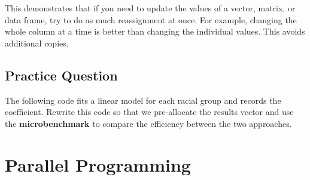 \documentclass[
  letterpaper,
]{latex/krantz}
\makeatletter
\newenvironment{Shaded}{\begin{snugshade}}{\end{snugshade}}
\newcommand{\AttributeTok}[1]{\textcolor[rgb]{0.40,0.45,0.13}{#1}}
\newcommand{\ControlFlowTok}[1]{\textcolor[rgb]{0.00,0.23,0.31}{#1}}
\newcommand{\DecValTok}[1]{\textcolor[rgb]{0.68,0.00,0.00}{#1}}
\newcommand{\FunctionTok}[1]{\textcolor[rgb]{0.28,0.35,0.67}{#1}}
\newcommand{\NormalTok}[1]{\textcolor[rgb]{0.00,0.23,0.31}{#1}}
\newcommand{\OtherTok}[1]{\textcolor[rgb]{0.00,0.23,0.31}{#1}}
\newcommand{\SpecialCharTok}[1]{\textcolor[rgb]{0.37,0.37,0.37}{#1}}
\newenvironment{kframe}{%
\medskip{}
\setlength{\fboxsep}{.8em}
 \def\at@end@of@kframe{}%
 \ifinner\ifhmode%
  \def\at@end@of@kframe{\end{minipage}}%
  \begin{minipage}{\columnwidth}%
 \fi\fi%
 \def\FrameCommand##1{\hskip\@totalleftmargin \hskip-\fboxsep
 \colorbox{shadecolor}{##1}\hskip-\fboxsep
     \hskip-\linewidth \hskip-\@totalleftmargin \hskip\columnwidth}%
 \MakeFramed {\advance\hsize-\width
   \@totalleftmargin\z@ \linewidth\hsize
   \@setminipage}}%
 {\par\unskip\endMakeFramed%
 \at@end@of@kframe}
\renewenvironment{Shaded}{\begin{kframe}}{\end{kframe}}
\makeatother
\begin{document}
This demonstrates that if you need to update the values of a vector,
matrix, or data frame, try to do as much reassignment at once. For
example, changing the whole column at a time is better than changing the
individual values. This avoids additional copies.

\subsection{Practice Question}\label{practice-question-31}

The following code fits a linear model for each racial group and records
the coefficient. Rewrite this code so that we pre-allocate the results
vector and use the \textbf{microbenchmark} to compare the efficiency
between the two approaches.

\begin{Shaded}
\end{Shaded}

\section{\texorpdfstring{Parallel Programming
}{Parallel Programming }}\label{parallel-programming}
\end{document}
